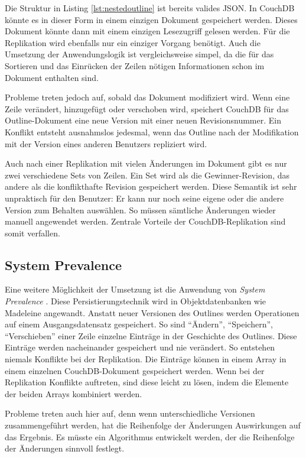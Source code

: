 Die Struktur in Listing \ref{lst:nestedoutline} ist bereits valides JSON. In CouchDB könnte es in dieser Form in einem einzigen Dokument gespeichert werden. Dieses Dokument könnte dann mit einem einzigen Lesezugriff gelesen werden. Für die Replikation wird ebenfalls nur ein einziger Vorgang benötigt. Auch die Umsetzung der Anwendungslogik ist vergleichsweise simpel, da die für das Sortieren und das Einrücken der Zeilen nötigen Informationen schon im Dokument enthalten sind.

Probleme treten jedoch auf, sobald das Dokument modifiziert wird. Wenn eine Zeile verändert, hinzugefügt oder verschoben wird, speichert CouchDB für das Outline-Dokument eine neue Version mit einer neuen Revisionsnummer. Ein Konflikt entsteht ausnahmslos jedesmal, wenn das Outline nach der Modifikation mit der Version eines anderen Benutzers repliziert wird. 

Auch nach einer Replikation mit vielen Änderungen im Dokument gibt es nur zwei verschiedene Sets von Zeilen. Ein Set wird als die Gewinner-Revision, das andere als die konflikthafte Revision gespeichert werden. Diese Semantik ist sehr unpraktisch für den Benutzer: Er kann nur noch seine eigene oder die andere Version zum Behalten auswählen. So müssen sämtliche Änderungen wieder manuell angewendet werden. Zentrale Vorteile der CouchDB-Replikation sind somit verfallen. 

\subsection{System Prevalence}

Eine weitere Möglichkeit der Umsetzung ist die Anwendung von \textit{System Prevalence} \cite{prevalence}. Diese Persistierungstechnik wird in Objektdatenbanken wie Madeleine \cite{madeleine} angewandt. Anstatt neuer Versionen des Outlines werden Operationen auf einem Ausgangsdatensatz gespeichert. So sind \enquote{Ändern}, \enquote{Speichern}, \enquote{Verschieben} einer Zeile einzelne Einträge in der Geschichte des Outlines. Diese Einträge werden nacheinander gespeichert und nie verändert. So entstehen niemals Konflikte bei der Replikation. Die Einträge können in einem Array in einem einzelnen CouchDB-Dokument gespeichert werden. Wenn bei der Replikation Konflikte auftreten, sind diese leicht zu lösen, indem die Elemente der beiden Arrays kombiniert werden.

Probleme treten auch hier auf, denn wenn unterschiedliche Versionen zusammengeführt werden, hat die Reihenfolge der Änderungen Auswirkungen auf das Ergebnis. Es müsste ein Algorithmus entwickelt werden, der die Reihenfolge der Änderungen sinnvoll festlegt.


